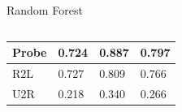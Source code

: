 \documentclass[12pt,aspectratio=169,notheorems]{beamer}
\begin{document}
\begin{frame}{Random Forest}
\begin{columns}[T]
\begin{table}[]
{\begin{tabular}{|l|l|l|l|}
                \multicolumn{1}{|l|}{Probe}  & 0.724                                   & 0.887                                & 0.797                                  \\ \hline
                \multicolumn{1}{|l|}{R2L}    & 0.727                                   & 0.809                                & 0.766                                  \\ \hline
                \multicolumn{1}{|l|}{U2R}    & 0.218                                   & 0.340                                & 0.266                                  \\ \hline
                \end{tabular}
            }
            \end{table}
    \end{columns}
\end{frame}
\end{document}
